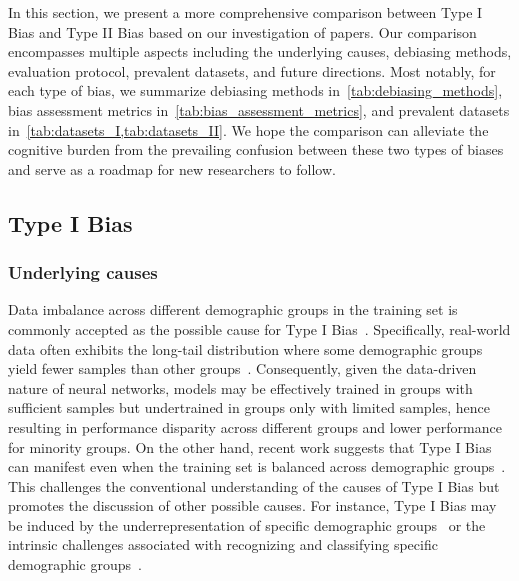 \label{sec:following}

In this section, we present a more comprehensive comparison between Type I Bias and Type II Bias based on our investigation of \pc papers.
Our comparison encompasses multiple aspects including the underlying causes, debiasing methods, evaluation protocol, prevalent datasets, and future directions.
Most notably, for each type of bias, we summarize debiasing methods in~\cref{tab:debiasing_methods}, bias assessment metrics in~\cref{tab:bias_assessment_metrics}, and prevalent datasets in~\cref{tab:datasets_I,tab:datasets_II}.
We hope the comparison can alleviate the cognitive burden from the prevailing confusion between these two types of biases and serve as a roadmap for new researchers to follow.





\subsection{Type I Bias} 

\subsubsection{Underlying causes}
Data imbalance across different demographic groups in the training set is commonly accepted as the possible cause for Type I Bias~\cite{cherepanova2023deep,roosli2022peeking}.
Specifically, real-world data often exhibits the long-tail distribution where some demographic groups yield fewer samples than other groups~\cite{long_tail}. 
Consequently, given the data-driven nature of neural networks, models may be effectively trained in groups with sufficient samples but undertrained in groups only with limited samples, hence resulting in performance disparity across different groups and lower performance for minority groups.
On the other hand, recent work suggests that Type I Bias can manifest even when the training set is balanced across demographic groups~\cite{RL_RBN}.
This challenges the conventional understanding of the causes of Type I Bias but promotes the discussion of other possible causes. For instance, Type I Bias may be induced by the underrepresentation of specific demographic groups~\cite{spurious_correlation_Underrepresentation} or the intrinsic challenges associated with recognizing and classifying specific demographic groups~\cite{FR_inherent_bias}. 





